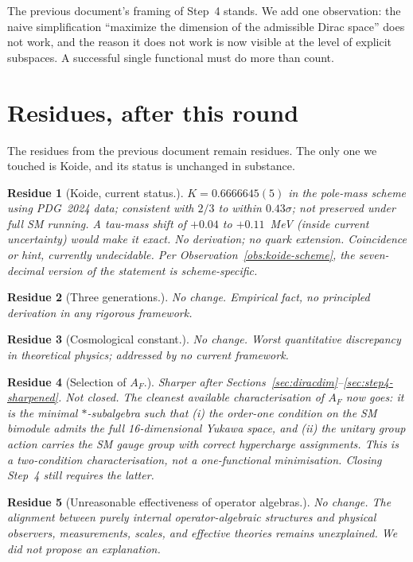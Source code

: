 \documentclass[11pt,a4paper]{article}
\newtheorem*{residue*}{Residue}
\begin{document}
The previous document's framing of Step~4 stands. We add one observation: the
naive simplification ``maximize the dimension of the admissible Dirac space''
does not work, and the reason it does not work is now visible at the level of
explicit subspaces. A successful single functional must do more than count.

\section{Residues, after this round}\label{sec:residues-2}

The residues from the previous document remain residues. The only one we
touched is Koide, and its status is unchanged in substance.

\begin{residue*}[Koide, current status.]
$K = 0.6666645(5)$ in the pole-mass scheme using PDG~2024 data; consistent
with $2/3$ to within $0.43\sigma$; not preserved under full SM running. A
tau-mass shift of $+0.04$ to $+0.11$~MeV (inside current uncertainty)
would make it exact. No derivation; no quark extension. Coincidence or hint,
currently undecidable. Per Observation~\ref{obs:koide-scheme}, the
seven-decimal version of the statement is scheme-specific.
\end{residue*}

\begin{residue*}[Three generations.]
No change. Empirical fact, no principled derivation in any rigorous
framework.
\end{residue*}

\begin{residue*}[Cosmological constant.]
No change. Worst quantitative discrepancy in theoretical physics; addressed by
no current framework.
\end{residue*}

\begin{residue*}[Selection of $A_F$.]
Sharper after Sections~\ref{sec:diracdim}--\ref{sec:step4-sharpened}.
Not closed.
The cleanest available characterisation of $A_F$ now goes: it is the minimal
$*$-subalgebra such that (i) the order-one condition on the SM bimodule admits
the full 16-dimensional Yukawa space, and (ii) the unitary group action carries
the SM gauge group with correct hypercharge assignments. This is a two-condition
characterisation, not a one-functional minimisation. Closing Step~4 still
requires the latter.
\end{residue*}

\begin{residue*}[Unreasonable effectiveness of operator algebras.]
No change. The alignment between purely internal operator-algebraic structures
and physical observers, measurements, scales, and effective theories remains
unexplained. We did not propose an explanation.
\end{residue*}
\end{document}
